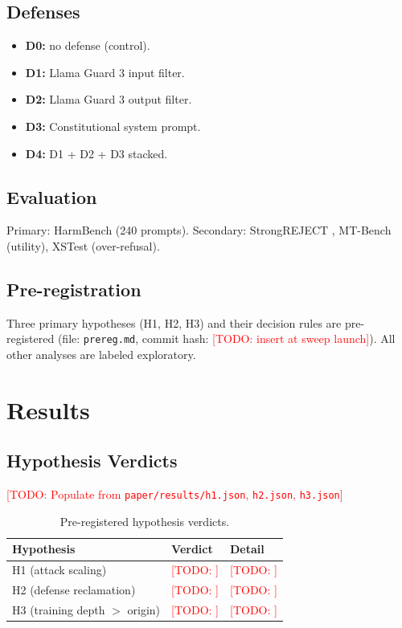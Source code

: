 \documentclass[11pt,letterpaper]{article}
\newcommand{\TODO}[1]{\textcolor{red}{[TODO: #1]}}
\begin{document}
\subsection{Defenses}

\begin{itemize}
  \item \textbf{D0:} no defense (control).
  \item \textbf{D1:} Llama Guard 3 input filter.
  \item \textbf{D2:} Llama Guard 3 output filter.
  \item \textbf{D3:} Constitutional system prompt.
  \item \textbf{D4:} D1 + D2 + D3 stacked.
\end{itemize}

\subsection{Evaluation}

Primary: HarmBench \citep{mazeika2024harmbench} (240 prompts).
Secondary: StrongREJECT \citep{souly2024strongreject}, MT-Bench (utility),
XSTest (over-refusal).

\subsection{Pre-registration}

Three primary hypotheses (H1, H2, H3) and their decision rules are
pre-registered (file: \texttt{prereg.md}, commit hash: \TODO{insert at sweep launch}).
All other analyses are labeled exploratory.

\section{Results}
\label{sec:results}

\subsection{Hypothesis Verdicts}

\TODO{Populate from \texttt{paper/results/h1.json}, \texttt{h2.json}, \texttt{h3.json}}

\begin{table}[h]
\centering
\caption{Pre-registered hypothesis verdicts.}
\begin{tabular}{lll}
\toprule
Hypothesis & Verdict & Detail \\
\midrule
H1 (attack scaling) & \TODO{} & \TODO{} \\
H2 (defense reclamation) & \TODO{} & \TODO{} \\
H3 (training depth $>$ origin) & \TODO{} & \TODO{} \\
\bottomrule
\end{tabular}
\end{table}
\end{document}
